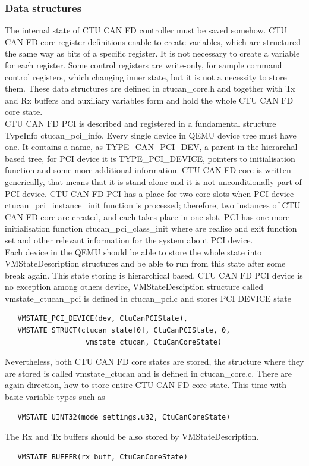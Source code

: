 \documentclass{ctuthesis}
\begin{document}
  \subsubsection{Data structures}
  The internal state of CTU CAN FD controller must be saved somehow. CTU CAN FD core register definitions enable to create variables, which are structured the same way as bits of a specific register. It is not necessary to create a variable for each register. Some control registers are write-only, for sample command control registers, which changing inner state, but it is not a necessity to store them. These data structures are defined in ctucan\_core.h and together with Tx and Rx buffers and auxiliary variables form and hold the whole CTU CAN FD core state. \\
  CTU CAN FD PCI is described and registered in a fundamental structure TypeInfo ctucan\_pci\_info. Every single device in QEMU device tree must have one. It contains a name, as TYPE\_CAN\_PCI\_DEV, a parent in the hierarchal based tree, for PCI device it is TYPE\_PCI\_DEVICE, pointers to initialisation function and some more additional information. CTU CAN FD core is written generically, that means that it is stand-alone and it is not unconditionally part of PCI device. CTU CAN FD PCI has a place for two core slots when PCI device ctucan\_pci\_instance\_init function is processed; therefore, two instances of CTU CAN FD core are created, and each takes place in one slot. PCI has one more initialisation function ctucan\_pci\_class\_init where are realise and exit function set and other relevant information for the system about PCI device. \\
  Each device in the QEMU should be able to store the whole state into VMStateDescription structures and be able to run from this state after some break again. This state storing is hierarchical based. CTU CAN FD PCI device is no exception among others device, VMStateDesciption structure called vmstate\_ctucan\_pci is defined in ctucan\_pci.c and stores PCI DEVICE state
   \begin{verbatim}   VMSTATE_PCI_DEVICE(dev, CtuCanPCIState),
   VMSTATE_STRUCT(ctucan_state[0], CtuCanPCIState, 0,
                   vmstate_ctucan, CtuCanCoreState)\end{verbatim}
  Nevertheless, both CTU CAN FD core states are stored, the structure where they are stored is called vmstate\_ctucan and is defined in ctucan\_core.c. There are again direction, how to store entire CTU CAN FD core state. This time with basic variable types such as
   \begin{verbatim}   VMSTATE_UINT32(mode_settings.u32, CtuCanCoreState)\end{verbatim}
  The Rx and Tx buffers should be also stored by VMStateDescription.
  \begin{verbatim}   VMSTATE_BUFFER(rx_buff, CtuCanCoreState)\end{verbatim}
 
\end{document}
